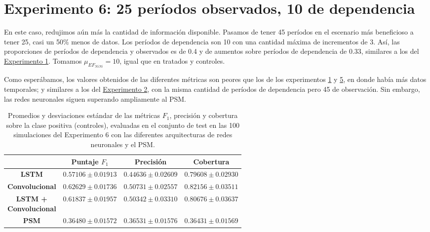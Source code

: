 \documentclass[../../main.tex]{subfiles}
\begin{document}
\section{Experimento 6: 25 períodos observados, 10 de dependencia} \label{sec:exp6}

En este caso, redujimos aún más la cantidad de información disponible. Pasamos de tener 45
períodos en el escenario más beneficioso a tener 25, casi un 50\% menos de datos. Los
períodos de dependencia son 10 con una cantidad máxima de incrementos de 3. Así, las
proporciones de períodos de dependencia y observados es de 0.4 y de aumentos sobre
períodos de dependencia de 0.33, similares a los del \hyperref[sec:exp1]{Experimento 1}.
Tomamos \(\mu_{{EF}_{NiNi}} = 10\), igual que en tratados y controles.

Como esperábamos, los valores obtenidos de las diferentes métricas son peores que los de
los experimentos \hyperref[sec:exp1]{1} y \hyperref[sec:exp5]{5}, en donde había más datos
temporales; y similares a los del \hyperref[sec:exp2]{Experimento 2}, con la misma
cantidad de períodos de dependencia pero 45 de observación. Sin embargo, las redes
neuronales siguen superando ampliamente al PSM.

\begin{table}[H]
    \centering
    \renewcommand{\arraystretch}{1.2}
    \begin{tabular}{|c|c|c|c|}
        \hline
         & \textbf{Puntaje} \(F_1\) & \textbf{Precisión} & \textbf{Cobertura} \\ \hline\hline
        \textbf{LSTM}
            & $0.57106 \pm 0.01913$ & $0.44636 \pm 0.02609$ & $0.79608 \pm 0.02930$ \\ \hline
        \textbf{Convolucional}
            & $\mathbf{0.62629 \pm 0.01736}$ & $\mathbf{0.50731 \pm 0.02557}$ & $\mathbf{0.82156 \pm 0.03511}$ \\ \hline
        \makecell{\textbf{LSTM +} \\ \textbf{Convolucional}}
            & $0.61837 \pm 0.01957$ & $0.50342 \pm 0.03310$ & $0.80676 \pm 0.03637$ \\ \hline
        \textbf{PSM}
            & $0.36480 \pm 0.01572$ & $0.36531 \pm 0.01576$ & $0.36431 \pm 0.01569$ \\
        \hline
    \end{tabular}
    \caption{Promedios y desviaciones estándar de las métricas \(F_1\), precisión y
    cobertura sobre la clase positiva (controles), evaluadas en el conjunto de test en las
    100 simulaciones del Experimento 6 con las diferentes arquitecturas de redes
    neuronales y el PSM.}
    \label{tab:results_exp6}
\end{table}
\end{document}
